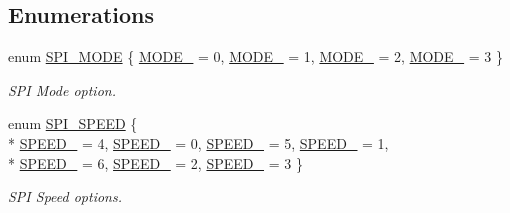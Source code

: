 \subsection*{Enumerations}
\begin{DoxyCompactItemize}
\item 
enum \hyperlink{group__spi_gae506139af46f1328f631ddacd54af96d}{S\-P\-I\-\_\-\-M\-O\-D\-E} \{ \hyperlink{group__spi_ggae506139af46f1328f631ddacd54af96da68ae6cc4ed3f27fe8040eb93d9c4efa3}{M\-O\-D\-E\-\_} = 0, 
\hyperlink{group__spi_ggae506139af46f1328f631ddacd54af96daf25f6bda513005f645d3626d9391f8cc}{M\-O\-D\-E\-\_} = 1, 
\hyperlink{group__spi_ggae506139af46f1328f631ddacd54af96da0a36399f2feba688abe010c193b8a5f1}{M\-O\-D\-E\-\_} = 2, 
\hyperlink{group__spi_ggae506139af46f1328f631ddacd54af96dad94e70da03012c70efde66c9136b0981}{M\-O\-D\-E\-\_} = 3
 \}
\begin{DoxyCompactList}\small\item\em S\-P\-I Mode option. \end{DoxyCompactList}\item 
enum \hyperlink{group__spi_ga92b13fd51af2a9a09b1854520a5a427f}{S\-P\-I\-\_\-\-S\-P\-E\-E\-D} \{ \\*
\hyperlink{group__spi_gga92b13fd51af2a9a09b1854520a5a427fa3e1a04cc2aad70558b57122e6b70f8b6}{S\-P\-E\-E\-D\-\_} = 4, 
\hyperlink{group__spi_gga92b13fd51af2a9a09b1854520a5a427fae11af3cd43c20a2067c8656e851f5898}{S\-P\-E\-E\-D\-\_} = 0, 
\hyperlink{group__spi_gga92b13fd51af2a9a09b1854520a5a427faa29ab48ff495c06b667f4a9a619b2296}{S\-P\-E\-E\-D\-\_} = 5, 
\hyperlink{group__spi_gga92b13fd51af2a9a09b1854520a5a427fa7eb7eef4c4f6e11040a40d1a34fa7ede}{S\-P\-E\-E\-D\-\_} = 1, 
\\*
\hyperlink{group__spi_gga92b13fd51af2a9a09b1854520a5a427fac9ddd00c987ca0f77965762d7e73393d}{S\-P\-E\-E\-D\-\_} = 6, 
\hyperlink{group__spi_gga92b13fd51af2a9a09b1854520a5a427faec264204118211e58417f9cb466dd609}{S\-P\-E\-E\-D\-\_} = 2, 
\hyperlink{group__spi_gga92b13fd51af2a9a09b1854520a5a427faa0503562f9205b335a03f39c54ff529e}{S\-P\-E\-E\-D\-\_} = 3
 \}
\begin{DoxyCompactList}\small\item\em S\-P\-I Speed options. \end{DoxyCompactList}\end{DoxyCompactItemize}
